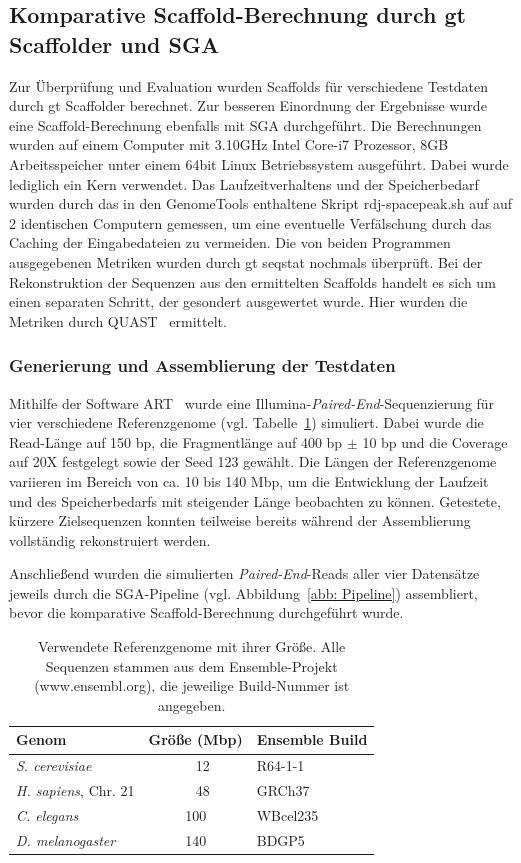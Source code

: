 \documentclass[a4paper,10pt,parskip]{scrartcl}
\begin{document}
\subsection{Komparative Scaffold-Berechnung durch gt Scaffolder und SGA}
Zur Überprüfung und Evaluation wurden Scaffolds für verschiedene Testdaten durch
gt Scaffolder berechnet. Zur besseren Einordnung der Ergebnisse wurde eine
Scaffold-Berechnung ebenfalls mit SGA durchgeführt. Die Berechnungen wurden auf
einem Computer mit 3.10GHz Intel Core-i7 Prozessor, 8GB Arbeitsspeicher unter
einem 64bit Linux Betriebssystem ausgeführt. Dabei wurde lediglich ein Kern
verwendet. Das Laufzeitverhaltens und der Speicherbedarf wurden durch das in den
GenomeTools enthaltene Skript rdj-spacepeak.sh auf auf 2 identischen Computern
gemessen, um eine eventuelle Verfälschung durch das
Caching der Eingabedateien zu vermeiden. Die von beiden Programmen ausgegebenen
Metriken wurden durch gt seqstat nochmals überprüft. Bei der
Rekonstruktion der Sequenzen aus den ermittelten Scaffolds handelt es sich um
einen separaten Schritt, der gesondert ausgewertet wurde. Hier wurden die
Metriken durch QUAST~\cite{Gurevich:2013je} ermittelt.

\subsubsection*{Generierung und Assemblierung der Testdaten}
Mithilfe der Software ART~\cite{Huang:2012kq} wurde eine
Illumina-\textit{Paired-End}-Sequenzierung für vier verschiedene Referenzgenome
(vgl. Tabelle~\ref{tab: Referenzgenome}) simuliert. Dabei wurde die Read-Länge
auf 150 bp, die Fragmentlänge auf 400 bp $\pm$ 10 bp und die Coverage auf
20X festgelegt sowie der Seed 123 gewählt. Die Längen der Referenzgenome
variieren im Bereich von ca. 10 bis 140 Mbp, um die Entwicklung der Laufzeit
und des Speicherbedarfs mit steigender Länge beobachten zu können.
Getestete, kürzere Zielsequenzen konnten teilweise bereits während der
Assemblierung vollständig rekonstruiert werden.

Anschließend wurden die simulierten \textit{Paired-End}-Reads aller vier
Datensätze jeweils durch die SGA-Pipeline (vgl. Abbildung~\ref{abb: Pipeline})
assembliert, bevor die komparative Scaffold-Berechnung durchgeführt wurde.

\begin{table}
  \centering
  \begin{tabular}{lcl}
    Genom & Größe (Mbp) & Ensemble Build \\
    \hline
    \textit{S. cerevisiae} &~~12 & R64-1-1 \\
    \textit{H. sapiens}, Chr. 21 &~~48 & GRCh37 \\
    \textit{C. elegans} & 100 & WBcel235 \\
    \textit{D. melanogaster} & 140 & BDGP5
  \end{tabular}
  \caption{\label{tab: Referenzgenome}Verwendete Referenzgenome mit ihrer
  Größe. Alle Sequenzen stammen aus dem Ensemble-Projekt (www.ensembl.org),
  die jeweilige Build-Nummer ist angegeben.}
\end{table}
\end{document}
